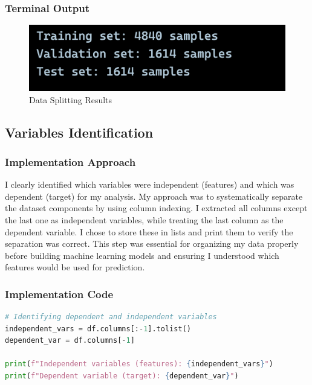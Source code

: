 \documentclass[12pt,a4paper]{article}
\begin{document}
\subsubsection{Terminal Output}
\begin{figure}[h!]
\centering
    \includegraphics[width=\textwidth]{Figures/split_output.png}
    \caption{Data Splitting Results}
\end{figure}

\subsection{Variables Identification}

\subsubsection{Implementation Approach}
I clearly identified which variables were independent (features) and which was dependent (target) for my analysis. My approach was to systematically separate the dataset components by using column indexing. I extracted all columns except the last one as independent variables, while treating the last column as the dependent variable. I chose to store these in lists and print them to verify the separation was correct. This step was essential for organizing my data properly before building machine learning models and ensuring I understood which features would be used for prediction.

\subsubsection{Implementation Code}
\begin{lstlisting}[language=Python, caption=Dependent and Independent Variables Identification]
# Identifying dependent and independent variables
independent_vars = df.columns[:-1].tolist()
dependent_var = df.columns[-1]

print(f"Independent variables (features): {independent_vars}")
print(f"Dependent variable (target): {dependent_var}")
\end{lstlisting}
\end{document}
